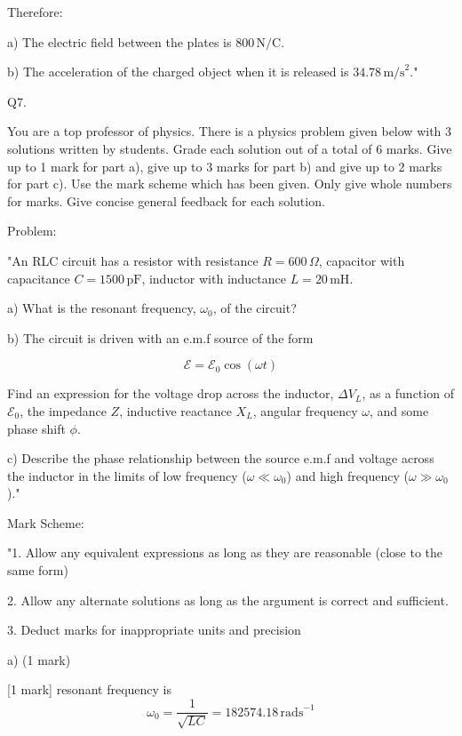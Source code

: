 Therefore:

a) The electric field between the plates is \( 800 \, \text{N/C} \).

b) The acceleration of the charged object when it is released is \( 34.78 \, \text{m/s}^2 \)."



                           Q7. 

You are a top professor of physics. There is a physics problem given below with 3 solutions written by students. Grade each solution out of a total of 6 marks. Give up to 1 mark for part a), give up to 3 marks for part b) and give up to 2 marks for part c). Use the mark scheme which has been given. Only give whole numbers for marks. Give concise general feedback for each solution. 

Problem:

"An RLC circuit has a resistor with resistance \( R = 600 \, \Omega \), capacitor with capacitance \( C = 1500 \, \text{pF} \), inductor with inductance \( L = 20 \, \text{mH} \).

a) What is the resonant frequency, \( \omega_{0} \), of the circuit?

b) The circuit is driven with an e.m.f source of the form 

\[ \mathcal{E} = \mathcal{E}_{0} \cos(\omega t) \]

Find an expression for the voltage drop across the inductor, \( \Delta V_{L} \), as a function of \( \mathcal{E}_{0} \), the impedance \( Z \), inductive reactance \( X_{L} \), angular frequency \( \omega \), and some phase shift \( \phi \).

c) Describe the phase relationship between the source e.m.f and voltage across the inductor in the limits of low frequency (\( \omega \ll \omega_{0} \)) and high frequency (\( \omega \gg \omega_{0} \))."

Mark Scheme:

"1. Allow any equivalent expressions as long as they are reasonable (close to the same form)

2. Allow any alternate solutions as long as the argument is correct and sufficient. 

3. Deduct marks for inappropriate units and precision

a) (1 mark) 

[1 mark]  resonant frequency is 
\[ \omega_0 = \frac{1}{\sqrt{LC}} = 182574.18 \, \mathrm{rads}^{-1} \]

